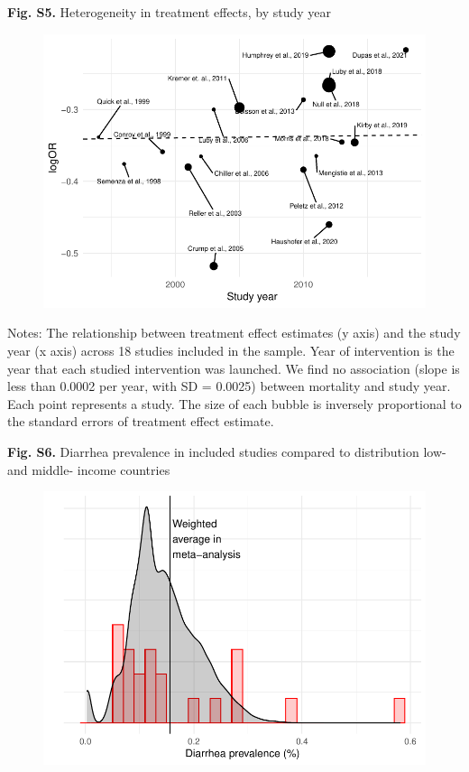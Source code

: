 \documentclass[12pt]{article}
\begin{document}
\newpage
\noindent\textbf{Fig. S5.}  Heterogeneity in treatment effects, by study year
\begin{figure}[H]
    \centering
    \includegraphics{figures/bubble-plot-year.pdf}
\end{figure}
{\noindent\fontsize{10}{10}\selectfont Notes: The relationship between treatment effect estimates (y axis) and the study year (x axis) across 18 studies included in the sample. Year of intervention is the year that each studied intervention was launched. We find no association (slope is less than 0.0002 per year, with SD = 0.0025) between mortality and study year. Each point represents a study. The size of each bubble is inversely proportional to the standard errors of treatment effect estimate.}



\newpage
\noindent\textbf{Fig. S6.} Diarrhea prevalence in included studies compared to distribution low- and middle- income countries
\begin{figure}[H]
    \centering
    \includegraphics{figures/dist-diarrhea-prevalence.pdf}
\end{figure}
\end{document}
